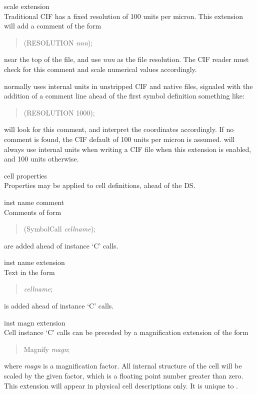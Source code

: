 \begin{description}
\item{\cb scale extension}\\
Traditional CIF has a fixed resolution of 100 units per micron.
This extension will add a comment of the form
\begin{quote}
{\vt (RESOLUTION} {\it nnn\/}{\vt );}
\end{quote}
near the top of the file, and use {\it nnn} as the file resolution. 
The CIF reader must check for this comment and scale numerical values
accordingly.

{\Xic} normally uses internal units in unstripped CIF and native
files, signaled with the addition of a comment line ahead of the first
symbol definition something like:
\begin{quote}
{\vt (RESOLUTION 1000);}
\end{quote}
{\Xic} will look for this comment, and interpret the coordinates
accordingly.  If no comment is found, the CIF default of 100 units per
micron is assumed.  {\Xic} will always use internal units when writing a
CIF file when this extension is enabled, and 100 units otherwise.

\item{\cb cell properties}\\
Properties may be applied to cell definitions, ahead of the {\vt DS}.

\item{\cb inst name comment}\\
Comments of form
\begin{quote}
{\vt (SymbolCall} {\it cellname\/}{\vt );}
\end{quote}
are added ahead of instance `{\vt C}' calls.

\item{\cb inst name extension}\\
Text in the form
\begin{quote}
{} {\it cellname}{\vt ;}
\end{quote}
is added ahead of instance `{\vt C}' calls.

\item{\cb inst magn extension}\\
Cell instance `{\vt C}' calls can be preceded by a
magnification extension of the form
\begin{quote}
{ Magnify} {\it magn}{\vt ;}
\end{quote}
where {\it magn} is a magnification factor.  All internal structure of
the cell will be scaled by the given factor, which is a floating point
number greater than zero.  This extension will appear in physical cell
descriptions only.  It is unique to {\Xic}.


\end{description}
